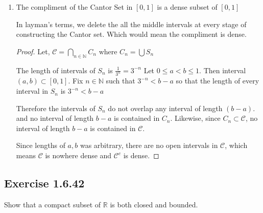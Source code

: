 \documentclass{tufte-book}
\theoremstyle{mytheoremstyle}
\theoremstyle{mylemstyle}
\theoremstyle{mydefstyle}
\begin{document}
\begin{enumerate}
\begin{proof}
Let $C_n = \bigcup S_m$ where $S_m$ is a finite number of closed sets. For any $x \in S_m$ let $\bar{x}$ be the right end point of $S_m$, unless $x = \bar{x}$ then let $\bar{x}$ be the left endpoint. By construction, each subinterval of $S_m$ has length $\frac{1}{3^n}$.  Which means $|x - x_m| < \frac{1}{3^n}$.

This implies that the sequence of $x_m$ converges to $x$ and such is an accumulation point.  Since we chose $x$ to be arbitrary, this applies to all $x \in \mathcal{C}$.  
\end{proof}

\item The compliment of the Cantor Set in $[0,1]$ is a dense subset of $[0,1]$

In layman's terms, we delete the all the middle intervals at every stage of constructing the Cantor set.  Which would mean the compliment is dense.

\begin{proof} Let, $\mathcal{C} = \bigcap\limits_{n \in \mathbb{N}}C_n \text{ where }C_n = \bigcup S_n$

The length of intervals of $S_n$ is $\frac{1}{3^n} = 3^{-n}$ Let $0 \leq a < b \leq 1$. Then interval $(a, b) \subset [0,1]$.  Fix $n \in \mathbb{N}$ such that $3^{-n} < b-a$ so that the length of every interval in $S_n$ is $3^{-n} < b-a$

Therefore the intervals of $S_n$ do not overlap any interval of length $(b-a)$.  and no interval of length $b-a$ is contained in $C_n$.  Likewise, since $C_n \subset \mathcal{C}$, no interval of length $b-a$ is contained in $\mathcal{C}$.

Since lengths of $a,b$ was arbitrary, there are no open intervals in $\mathcal{C}$, which means $\mathcal{C}$ is nowhere dense and $\mathcal{C}^c$ is dense.
\end{proof}

\end{enumerate}

\subsection{Exercise 1.6.42}
Show that a compact subset of $\mathbb{R}$ is both closed and bounded.
\end{document}
